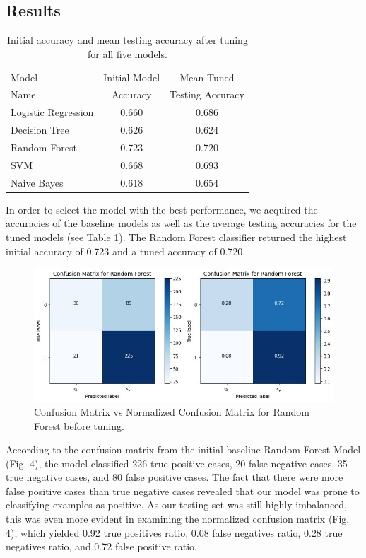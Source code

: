 \documentclass{article}
\begin{document}
\subsection{Results}

\begin{table}[H]
\begin{tabular}{ l c c}
\hline
Model  & Initial Model & Mean Tuned  \\
Name & Accuracy & Testing Accuracy\\
\hline 
Logistic Regression & 0.660 & 0.686\\
Decision Tree & 0.626 & 0.624\\
Random Forest & 0.723 & 0.720\\
SVM &0.668 &0.693\\
Naive Bayes&0.618& 0.654\\
\hline
\end{tabular}
\caption{\label{tab:table-name} Initial accuracy and mean testing accuracy after tuning for all five models.}
\vspace{-0.5cm}
\end{table}


In order to select the model with the best performance, we acquired the accuracies of the baseline models as well as the average testing accuracies for the tuned models (see Table 1). The Random Forest classifier returned the highest initial accuracy of 0.723 and a tuned accuracy of 0.720.

\begin{figure}[H]
    \raggedright
    \includegraphics[width= \columnwidth]{Figure 2.jpg}
    \caption{Confusion Matrix vs Normalized Confusion Matrix for Random Forest before tuning.}
    \vspace{-0.5cm}
\end{figure}

According to the confusion matrix from the initial baseline Random Forest Model (Fig. 4), the model classified 226 true positive cases, 20 false negative cases, 35 true negative cases, and 80 false positive cases. The fact that there were more false positive cases than true negative cases revealed that our model was prone to classifying examples as positive. As our testing set was still highly imbalanced, this was even more evident in examining the normalized confusion matrix (Fig. 4), which yielded 0.92 true positives ratio, 0.08 false negatives ratio, 0.28 true negatives ratio, and 0.72 false positive ratio. 
\end{document}
